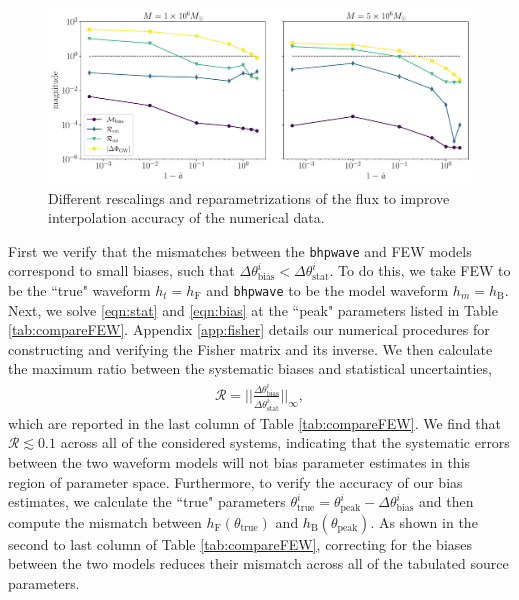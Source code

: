 \documentclass[%
 reprint,
 nofootinbib,
 amsmath,amssymb,
 aps,
 prd,
]{revtex4-2}
\begin{document}
\begin{figure}[!htp]
    \centering
    \includegraphics[width=0.98\linewidth]{figures/flux_error.pdf}
    \caption{Different rescalings and reparametrizations of the flux to improve interpolation accuracy of the numerical data.}
    \label{fig:errorBiases}
\end{figure}

First we verify that the mismatches between the \texttt{bhpwave} and FEW models correspond to small biases, such that $\Delta {\theta}^{i}_\mathrm{bias} < \Delta {\theta}^{i}_\mathrm{stat}$. To do this, we take FEW to be the ``true" waveform $h_t = h_\mathrm{F}$ and \texttt{bhpwave} to be the model waveform $h_m = h_\mathrm{B}$. Next, we solve \eqref{eqn:stat} and \eqref{eqn:bias} at the ``peak" parameters listed in Table \ref{tab:compareFEW}. Appendix \ref{app:fisher} details our numerical procedures for constructing and verifying the Fisher matrix and its inverse. We then calculate the maximum ratio between the systematic biases and statistical uncertainties,
\begin{align}
    \mathcal{R} = \bigg|\bigg|\frac{\Delta \theta^i_\mathrm{bias}}{\Delta {\theta}^i_\mathrm{stat}}\bigg|\bigg|_\infty,
\end{align}
which are reported in the last column of Table \ref{tab:compareFEW}. We find that $\mathcal{R} \lesssim 0.1$ across all of the considered systems, indicating that the systematic errors between the two waveform models will not bias parameter estimates in this region of parameter space. Furthermore, to verify the accuracy of our bias estimates, we calculate the ``true" parameters $\theta^i_\mathrm{true} = \theta^i_\mathrm{peak} - \Delta \theta^i_\mathrm{bias}$ and then compute the mismatch between $h_\mathrm{F}(\theta_\mathrm{true})$ and $h_\mathrm{B}(\theta_\mathrm{peak})$. As shown in the second to last column of Table \ref{tab:compareFEW}, correcting for the biases between the two models reduces their mismatch across all of the tabulated source parameters.
\end{document}
